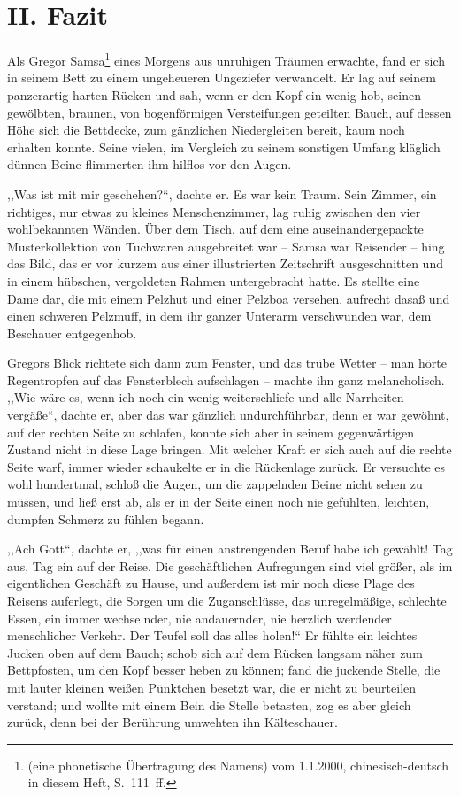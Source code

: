 \documentclass[prepress]{zchinr}
\begin{document}
\section{II. Fazit}

Als Gregor Samsa\footnote{ (eine phonetische Übertragung des Namens) vom 1.1.2000, chinesisch-deutsch in diesem Heft, S.~111~ff.} eines Morgens aus unruhigen Träumen erwachte, fand er sich in seinem Bett zu einem ungeheueren Ungeziefer verwandelt. Er lag auf seinem panzerartig harten Rücken und sah, wenn er den Kopf ein wenig hob, seinen gewölbten, braunen, von bogenförmigen Versteifungen geteilten Bauch, auf dessen Höhe sich die Bettdecke, zum gänzlichen Niedergleiten bereit, kaum noch erhalten konnte. Seine vielen, im Vergleich zu seinem sonstigen Umfang kläglich dünnen Beine flimmerten ihm hilflos vor den Augen.

,,Was ist mit mir geschehen?{}``, dachte er. Es war kein Traum. Sein Zimmer, ein richtiges, nur etwas zu kleines Menschenzimmer, lag ruhig zwischen den vier wohlbekannten Wänden. Über dem Tisch, auf dem eine auseinandergepackte Musterkollektion von Tuchwaren ausgebreitet war -- Samsa war Reisender -- hing das Bild, das er vor kurzem aus einer illustrierten Zeitschrift ausgeschnitten und in einem hübschen, vergoldeten Rahmen untergebracht hatte. Es stellte eine Dame dar, die mit einem Pelzhut und einer Pelzboa versehen, aufrecht dasaß und einen schweren Pelzmuff, in dem ihr ganzer Unterarm verschwunden war, dem Beschauer entgegenhob.

Gregors Blick richtete sich dann zum Fenster, und das trübe Wetter -- man hörte Regentropfen auf das Fensterblech aufschlagen -- machte ihn ganz melancholisch. ,,Wie wäre es, wenn ich noch ein wenig weiterschliefe und alle Narrheiten vergäße``, dachte er, aber das war gänzlich undurchführbar, denn er war gewöhnt, auf der rechten Seite zu schlafen, konnte sich aber in seinem gegenwärtigen Zustand nicht in diese Lage bringen. Mit welcher Kraft er sich auch auf die rechte Seite warf, immer wieder schaukelte er in die Rückenlage zurück. Er versuchte es wohl hundertmal, schloß die Augen, um die zappelnden Beine nicht sehen zu müssen, und ließ erst ab, als er in der Seite einen noch nie gefühlten, leichten, dumpfen Schmerz zu fühlen begann.

,,Ach Gott``, dachte er, ,,was für einen anstrengenden Beruf habe ich gewählt! Tag aus, Tag ein auf der Reise. Die geschäftlichen Aufregungen sind viel größer, als im eigentlichen Geschäft zu Hause, und außerdem ist mir noch diese Plage des Reisens auferlegt, die Sorgen um die Zuganschlüsse, das unregelmäßige, schlechte Essen, ein immer wechselnder, nie andauernder, nie herzlich werdender menschlicher Verkehr. Der Teufel soll das alles holen!{}`` Er fühlte ein leichtes Jucken oben auf dem Bauch; schob sich auf dem Rücken langsam näher zum Bettpfosten, um den Kopf besser heben zu können; fand die juckende Stelle, die mit lauter kleinen weißen Pünktchen besetzt war, die er nicht zu beurteilen verstand; und wollte mit einem Bein die Stelle betasten, zog es aber gleich zurück, denn bei der Berührung umwehten ihn Kälteschauer.
\end{document}
